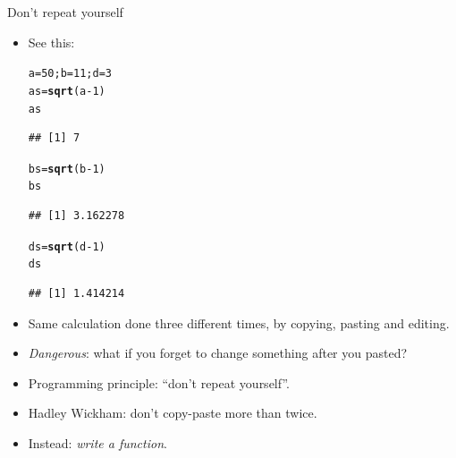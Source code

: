\documentclass[unknownkeysallowed]{beamer}\usepackage[]{graphicx}\usepackage[]{color}
\makeatletter
\newcommand{\hlnum}[1]{\textcolor[rgb]{0.686,0.059,0.569}{#1}}%
\newcommand{\hlopt}[1]{\textcolor[rgb]{0,0,0}{#1}}%
\newcommand{\hlstd}[1]{\textcolor[rgb]{0.345,0.345,0.345}{#1}}%
\newcommand{\hlkwb}[1]{\textcolor[rgb]{0.69,0.353,0.396}{#1}}%
\newcommand{\hlkwd}[1]{\textcolor[rgb]{0.737,0.353,0.396}{\textbf{#1}}}%
\newenvironment{kframe}{%
 \def\at@end@of@kframe{}%
 \ifinner\ifhmode%
  \def\at@end@of@kframe{\end{minipage}}%
  \begin{minipage}{\columnwidth}%
 \fi\fi%
 \def\FrameCommand##1{\hskip\@totalleftmargin \hskip-\fboxsep
 \colorbox{shadecolor}{##1}\hskip-\fboxsep
     \hskip-\linewidth \hskip-\@totalleftmargin \hskip\columnwidth}%
 \MakeFramed {\advance\hsize-\width
   \@totalleftmargin\z@ \linewidth\hsize
   \@setminipage}}%
 {\par\unskip\endMakeFramed%
 \at@end@of@kframe}
\newenvironment{knitrout}{}{} %
\makeatother
\begin{document}
\begin{frame}[fragile]{Don't repeat yourself}
  
  \begin{itemize}
    


  \item See this:
    
\begin{knitrout}
\color{fgcolor}\begin{kframe}
\begin{alltt}
\hlstd{a}\hlkwb{=}\hlnum{50} \hlstd{; b}\hlkwb{=}\hlnum{11} \hlstd{; d}\hlkwb{=}\hlnum{3}
\hlstd{as}\hlkwb{=}\hlkwd{sqrt}\hlstd{(a}\hlopt{-}\hlnum{1}\hlstd{)}
\hlstd{as}
\end{alltt}
\begin{verbatim}
## [1] 7
\end{verbatim}
\begin{alltt}
\hlstd{bs}\hlkwb{=}\hlkwd{sqrt}\hlstd{(b}\hlopt{-}\hlnum{1}\hlstd{)}
\hlstd{bs}
\end{alltt}
\begin{verbatim}
## [1] 3.162278
\end{verbatim}
\begin{alltt}
\hlstd{ds}\hlkwb{=}\hlkwd{sqrt}\hlstd{(d}\hlopt{-}\hlnum{1}\hlstd{)}
\hlstd{ds}
\end{alltt}
\begin{verbatim}
## [1] 1.414214
\end{verbatim}
\end{kframe}
\end{knitrout}

\item Same calculation done three different times, by copying, pasting
  and editing.
\item \emph{Dangerous}: what if you forget to change something after
  you pasted?
\item Programming principle: ``don't repeat yourself''.
\item Hadley Wickham: don't copy-paste more than twice.
\item Instead: \emph{write a function}.
  \end{itemize}
  
\end{frame}
\end{document}
